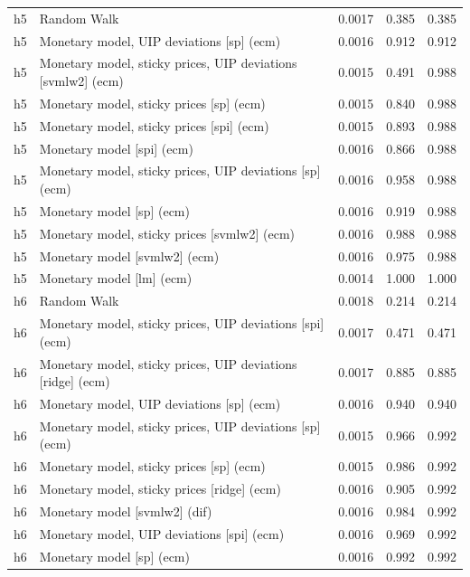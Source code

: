 \begin{ThreePartTable}
\begin{longtable}[t]{cp{5.5cm}ccc}
\addlinespace
h5 & \raggedright Random Walk & 0.0017 & 0.385 & 0.385\\
h5 & \raggedright Monetary model, UIP deviations [sp] (ecm) & 0.0016 & 0.912 & 0.912\\
h5 & \raggedright Monetary model, sticky prices, UIP deviations [svmlw2] (ecm) & 0.0015 & 0.491 & 0.988\\
h5 & \raggedright Monetary model, sticky prices [sp] (ecm) & 0.0015 & 0.840 & 0.988\\
h5 & \raggedright Monetary model, sticky prices [spi] (ecm) & 0.0015 & 0.893 & 0.988\\
h5 & \raggedright Monetary model [spi] (ecm) & 0.0016 & 0.866 & 0.988\\
h5 & \raggedright Monetary model, sticky prices, UIP deviations [sp] (ecm) & 0.0016 & 0.958 & 0.988\\
h5 & \raggedright Monetary model [sp] (ecm) & 0.0016 & 0.919 & 0.988\\
h5 & \raggedright Monetary model, sticky prices [svmlw2] (ecm) & 0.0016 & 0.988 & 0.988\\
h5 & \raggedright Monetary model [svmlw2] (ecm) & 0.0016 & 0.975 & 0.988\\
h5 & \raggedright Monetary model [lm] (ecm) & 0.0014 & 1.000 & 1.000\\
\addlinespace
h6 & \raggedright Random Walk & 0.0018 & 0.214 & 0.214\\
h6 & \raggedright Monetary model, sticky prices, UIP deviations [spi] (ecm) & 0.0017 & 0.471 & 0.471\\
h6 & \raggedright Monetary model, sticky prices, UIP deviations [ridge] (ecm) & 0.0017 & 0.885 & 0.885\\
h6 & \raggedright Monetary model, UIP deviations [sp] (ecm) & 0.0016 & 0.940 & 0.940\\
h6 & \raggedright Monetary model, sticky prices, UIP deviations [sp] (ecm) & 0.0015 & 0.966 & 0.992\\
h6 & \raggedright Monetary model, sticky prices [sp] (ecm) & 0.0015 & 0.986 & 0.992\\
h6 & \raggedright Monetary model, sticky prices [ridge] (ecm) & 0.0016 & 0.905 & 0.992\\
h6 & \raggedright Monetary model [svmlw2] (dif) & 0.0016 & 0.984 & 0.992\\
h6 & \raggedright Monetary model, UIP deviations [spi] (ecm) & 0.0016 & 0.969 & 0.992\\
h6 & \raggedright Monetary model [sp] (ecm) & 0.0016 & 0.992 & 0.992\\

\end{longtable}
\end{ThreePartTable}
